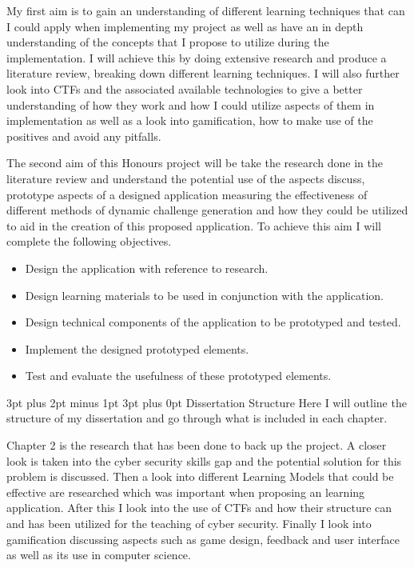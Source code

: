 \documentclass[12pt,a4paper]{article}
\makeatletter
\renewcommand\subsection{\@startsection {subsection}{1}{2mm} %
                               {3pt plus 2pt minus 1pt} %
                               {3pt plus 0pt} %
                               {\normalfont\bfseries}}
\makeatother
\begin{document}
My first aim is to gain an understanding of different learning techniques that can I could apply when implementing my project as well as have an in depth understanding of the concepts that I propose to utilize during the implementation. I will achieve this by doing extensive research and produce a literature review, breaking down different learning techniques. I will also further look into CTFs and the associated available technologies to give a better understanding of how they work and how I could utilize aspects of them in implementation as well as a look into gamification, how to make use of the positives and avoid any pitfalls.  

The second aim of this Honours project will be take the research done in the literature review and understand the potential use of the aspects discuss, prototype aspects of a designed application measuring the effectiveness of different methods of dynamic challenge generation and how they could be utilized to aid in the creation of this proposed application. To achieve this aim I will complete the following objectives.  

\begin{itemize}\itemsep0pt
	\item Design the application with reference to research.
	\item Design learning materials to be used in conjunction with the application.
	\item Design technical components of the application to be prototyped and tested. 
	\item Implement the designed prototyped elements. 
	\item Test and evaluate the usefulness of these prototyped elements.
\end{itemize}


\subsection{Dissertation Structure} 
Here I will outline the structure of my dissertation and go through what is included in each chapter. 

Chapter 2 is the research that has been done to back up the project. A closer look is taken into the cyber security skills gap and the potential solution for this problem is discussed. Then a look into different Learning Models that could be effective are researched which was important when proposing an learning application. After this I look into the use of CTFs and how their structure can and has been utilized for the teaching of cyber security. Finally I look into gamification discussing aspects such as game design, feedback and user interface as well as its use in computer science.  
\end{document}
